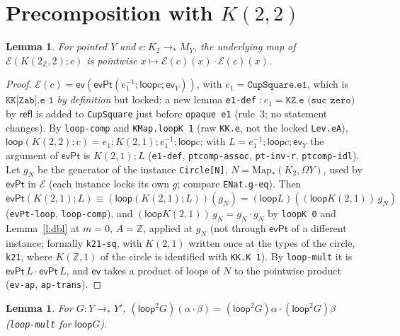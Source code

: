\documentclass[11pt]{amsart}
\newtheorem{lemma}[theorem]{Lemma}
\theoremstyle{definition}
\theoremstyle{remark}
\newcommand{\Om}{\Omega}
\newcommand{\Map}{\mathrm{Map}_*}
\newcommand{\Z}{\mathbb{Z}}
\newcommand{\code}[1]{\texttt{#1}}
\newcommand{\refl}{\mathsf{refl}}
\newcommand{\lp}{\mathsf{loop}}
\newcommand{\cE}{\mathcal E}
\begin{document}
\section{Precomposition with $K(2,2)$}

\begin{lemma}\label{l:E2}
For pointed $Y$ and $c:K_2\to_*M_Y$, the underlying map of
$\cE(K(2_\Z,2);c)$ is pointwise $x\mapsto\cE(c)(x)\cdot\cE(c)(x)$.
\end{lemma}
\begin{proof}
$\cE(c)=\mathsf{ev}(\mathsf{evPt}(e_1^{-1};\lp c;\mathsf{ev}_Y))$, with
$e_1=\code{CupSquare.e1}$, which is $\code{KK[Zab].e 1}$ \emph{by definition}
but locked: a new lemma \code{e1-def} $:e_1=\code{KZ.e (suc zero)}$ by $\refl$
is added to \code{CupSquare} just before \code{opaque e1} (rule~3; no
statement changes). By \code{loop-comp} and \code{KMap.loopK 1} (raw
\code{KK.e}, not the locked \code{Lev.eA}),
$\lp(K(2,2);c)=e_1;K(2,1);e_1^{-1};\lp c$; with
$L=e_1^{-1};\lp c;\mathsf{ev}_Y$ the argument of $\mathsf{evPt}$ is
$K(2,1);L$ (\code{e1-def}, \code{ptcomp-assoc}, \code{pt-inv-r},
\code{ptcomp-idl}). Let $g_N$ be the generator of the instance
\code{Circle[N]}, $N=\Map(K_2,\Om Y)$, used by $\mathsf{evPt}$ in $\cE$
(each instance locks its own $g$; compare \code{ENat.g-eq}). Then
$\mathsf{evPt}(K(2,1);L)\equiv(\lp(K(2,1);L))(g_N)=(\lp L)((\lp K(2,1))\,g_N)$
(\code{evPt-loop}, \code{loop-comp}), and
$(\lp K(2,1))\,g_N=g_N\cdot g_N$ by \code{loopK 0} and Lemma~\ref{l:dbl}
at $m=0$, $A=\Z$, applied at $g_N$ (not through $\mathsf{evPt}$ of a different
instance; formally \code{k21-sq}, with $K(2,1)$ written once at the types
of the circle, \code{k21}, where $K(\Z,1)$ of the circle is identified
with \code{KK.K 1}). By
\code{loop-mult} it is $\mathsf{evPt}\,L\cdot\mathsf{evPt}\,L$, and $\mathsf{ev}$ takes
a product of loops of $N$ to the pointwise product (\code{ev-ap},
\code{ap-trans}).
\end{proof}

\begin{lemma}\label{l:O2mult}
For $G:Y\to_*Y'$, $(\lp^2G)(\alpha\cdot\beta)=(\lp^2G)\alpha\cdot(\lp^2G)\beta$
(\code{loop-mult} for $\lp G$).
\end{lemma}
\end{document}
